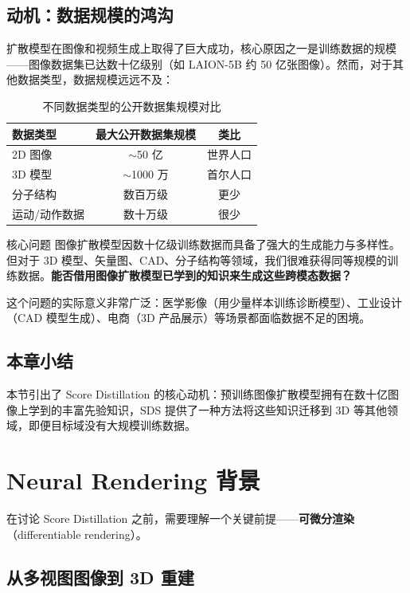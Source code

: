 \documentclass[a4paper]{article}
\begin{document}
\subsection{动机：数据规模的鸿沟}

扩散模型在图像和视频生成上取得了巨大成功，核心原因之一是训练数据的规模——图像数据集已达数十亿级别（如 LAION-5B 约 50 亿张图像）。然而，对于其他数据类型，数据规模远远不及：

\begin{table}[H]
\centering
\begin{tabular}{lcc}
\toprule
\textbf{数据类型} & \textbf{最大公开数据集规模} & \textbf{类比} \\
\midrule
2D 图像 & $\sim$50 亿 & 世界人口 \\
3D 模型 & $\sim$1000 万 & 首尔人口 \\
分子结构 & 数百万级 & 更少 \\
运动/动作数据 & 数十万级 & 很少 \\
\bottomrule
\end{tabular}
\caption{不同数据类型的公开数据集规模对比}
\end{table}

\begin{importantbox}{核心问题}
图像扩散模型因数十亿级训练数据而具备了强大的生成能力与多样性。但对于 3D 模型、矢量图、CAD、分子结构等领域，我们很难获得同等规模的训练数据。\textbf{能否借用图像扩散模型已学到的知识来生成这些跨模态数据？}
\end{importantbox}

这个问题的实际意义非常广泛：医学影像（用少量样本训练诊断模型）、工业设计（CAD 模型生成）、电商（3D 产品展示）等场景都面临数据不足的困境。

\subsection{本章小结}

本节引出了 Score Distillation 的核心动机：预训练图像扩散模型拥有在数十亿图像上学到的丰富先验知识，SDS 提供了一种方法将这些知识迁移到 3D 等其他领域，即便目标域没有大规模训练数据。

\newpage
\section{Neural Rendering 背景}

在讨论 Score Distillation 之前，需要理解一个关键前提——\textbf{可微分渲染}（differentiable rendering）。

\subsection{从多视图图像到 3D 重建}
\end{document}
